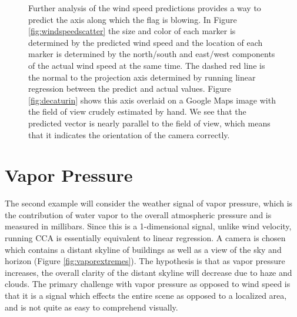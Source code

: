 \begin{figure}
	\centering
	\caption[Further analysis of the wind speed predictions provides a way to predict the axis along which the flag is blowing]{Further analysis of the wind speed predictions provides a way to predict the axis along which the flag is blowing. In Figure \ref{fig:windspeedscatter} the size and color of each marker is determined by the predicted wind speed and the location of each marker is determined by the north/south and east/west components of the actual wind speed at the same time. The dashed red line is the normal to the projection axis determined by running linear regression between the predict and actual values. Figure \ref{fig:decaturin} shows this axis overlaid on a Google Maps image with the field of view crudely estimated by hand. We see that the predicted vector is nearly parallel to the field of view, which means that it indicates the orientation of the camera correctly.}
	\label{fig:winddirpred}
\end{figure}

\section{Vapor Pressure}
The second example will consider the weather signal of vapor pressure, which is the contribution of water vapor to the overall atmospheric pressure and is measured in millibars. Since this is a 1-dimensional signal, unlike wind velocity, running CCA is essentially equivalent to linear regression. A camera is chosen which contains a distant skyline of buildings as well as a view of the sky and horizon (Figure \ref{fig:vaporextremes}). The hypothesis is that as vapor pressure increases, the overall clarity of the distant skyline will decrease due to haze and clouds. The primary challenge with vapor pressure as opposed to wind speed is that it is a signal which effects the entire scene as opposed to a localized area, and is not quite as easy to comprehend visually.

